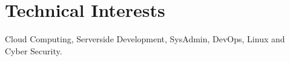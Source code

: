 \documentclass[a4paper,10pt]{extarticle} %
\begin{document}

\vspace{0.2cm}
\section{\textcolor{primary}{Technical Interests}}
\vspace{0.1cm}
\noindent Cloud Computing, Serverside Development, SysAdmin, DevOps, Linux and Cyber Security.\\





\end{document}
